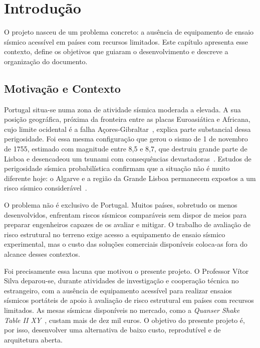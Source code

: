 

\chapter{Introdução}
\label{chapter:introduction}

\begin{introduction}
O projeto nasceu de um problema concreto: a ausência de equipamento de ensaio sísmico acessível em países com recursos limitados. Este capítulo apresenta esse contexto, define os objetivos que guiaram o desenvolvimento e descreve a organização do documento.
\end{introduction}

\section{Motivação e Contexto}
\label{sec:motivacao}

Portugal situa-se numa zona de atividade sísmica moderada a elevada. A sua posição geográfica, próxima da fronteira entre as placas Euroasiática e Africana, cujo limite ocidental é a falha Açores-Gibraltar~\cite{Borges2001}, explica parte substancial dessa perigosidade. Foi essa mesma configuração que gerou o sismo de 1 de novembro de 1755, estimado com magnitude entre 8,5 e 8,7, que destruiu grande parte de Lisboa e desencadeou um tsunami com consequências devastadoras~\cite{Baptista1998}. Estudos de perigosidade sísmica probabilística confirmam que a situação não é muito diferente hoje: o Algarve e a região da Grande Lisboa permanecem expostos a um risco sísmico considerável~\cite{Fonseca2007}.

O problema não é exclusivo de Portugal. Muitos países, sobretudo os menos desenvolvidos, enfrentam riscos sísmicos comparáveis sem dispor de meios para preparar engenheiros capazes de os avaliar e mitigar. O trabalho de avaliação de risco estrutural no terreno exige acesso a equipamento de ensaio sísmico experimental, mas o custo das soluções comerciais disponíveis coloca-as fora do alcance desses contextos.

Foi precisamente essa lacuna que motivou o presente projeto. O Professor Vítor Silva deparou-se, durante atividades de investigação e cooperação técnica no estrangeiro, com a ausência de equipamento acessível para realizar ensaios sísmicos portáteis de apoio à avaliação de risco estrutural em países com recursos limitados. As mesas sísmicas disponíveis no mercado, como a \textit{Quanser Shake Table II XY}~\cite{QuanserShakeTableIIXY}, custam mais de dez mil euros. O objetivo do presente projeto é, por isso, desenvolver uma alternativa de baixo custo, reprodutível e de arquitetura aberta.

